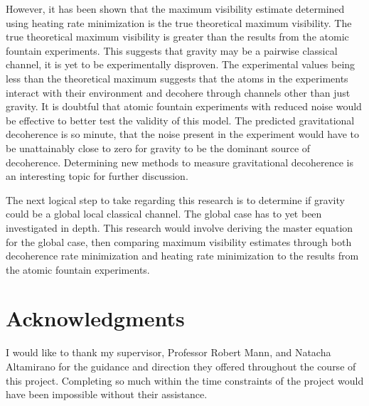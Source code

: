 \documentclass[aps, prd, superscriptaddress,twocolumn,amsmath,amssymb,nofootinbib]{revtex4-1}
\begin{document}
However, it has been shown that the maximum visibility estimate determined using heating rate minimization is the true theoretical maximum visibility. The true theoretical maximum visibility is greater than the results from the atomic fountain experiments. This suggests that gravity may be a pairwise classical channel, it is yet to be experimentally disproven. The experimental values being less than the theoretical maximum suggests that the atoms in the experiments interact with their environment and decohere through channels other than just gravity. It is doubtful that atomic fountain experiments with reduced noise would be effective to better test the validity of this model. The predicted gravitational decoherence is so minute, that the noise present in the experiment would have to be unattainably close to zero for gravity to be the dominant source of decoherence. Determining new methods to measure gravitational decoherence is an interesting topic for further discussion.

The next logical step to take regarding this research is to determine if gravity could be a global local classical channel. The global case has to yet been investigated in depth. This research would involve deriving the master equation for the global case, then comparing maximum visibility estimates through both decoherence rate minimization and heating rate minimization to the results from the atomic fountain experiments.


\section{Acknowledgments}
I would like to thank my supervisor, Professor Robert Mann, and Natacha Altamirano for the guidance and direction they offered throughout the course of this project. Completing so much within the time constraints of the project would have been impossible without their assistance.
\end{document}
